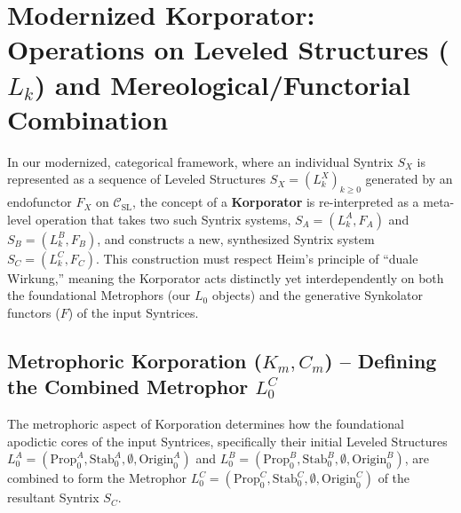 \documentclass[
    12pt,              %
    a4paper,           %
    headings=normal,   %
    twoside=true,      %
    BCOR=8mm,          %
]{scrbook}
\newcommand{\q}[1]{\enquote{#1}}
\begin{document}
\section{Modernized Korporator: Operations on Leveled Structures (\(L_k\)) and Mereological/Functorial Combination}
\label{sec:ch3_modernized_korporator} 

In our modernized, categorical framework, where an individual Syntrix \(S_X\) is represented as a sequence of Leveled Structures \(S_X = (L_k^X)_{k \ge 0}\) generated by an endofunctor \(F_X\) on \(\mathcal{C}_{\text{SL}}\), the concept of a \textbf{Korporator} is re-interpreted as a meta-level operation that takes two such Syntrix systems, \(S_A = (L_k^A, F_A)\) and \(S_B = (L_k^B, F_B)\), and constructs a new, synthesized Syntrix system \(S_C = (L_k^C, F_C)\). This construction must respect Heim's principle of \q{duale Wirkung,} meaning the Korporator acts distinctly yet interdependently on both the foundational Metrophors (our \(L_0\) objects) and the generative Synkolator functors (\(F\)) of the input Syntrices.

\subsection{Metrophoric Korporation (\(K_m, C_m\)) – Defining the Combined Metrophor \(L_0^C\)}
\label{sec:ch3_modern_metrophor_korp} 

The metrophoric aspect of Korporation determines how the foundational apodictic cores of the input Syntrices, specifically their initial Leveled Structures \(L_0^A = (\text{Prop}_0^A, \text{Stab}_0^A, \emptyset, \text{Origin}_0^A)\) and \(L_0^B = (\text{Prop}_0^B, \text{Stab}_0^B, \emptyset, \text{Origin}_0^B)\), are combined to form the Metrophor \(L_0^C = (\text{Prop}_0^C, \text{Stab}_0^C, \emptyset, \text{Origin}_0^C)\) of the resultant Syntrix \(S_C\).
\end{document}
